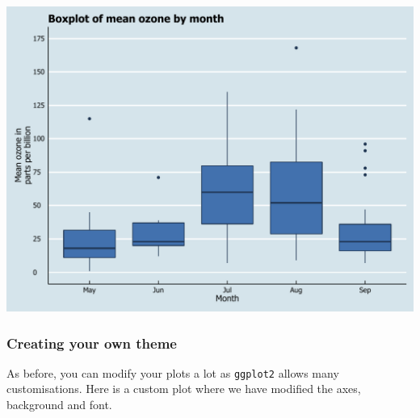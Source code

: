 \documentclass[]{article}
\begin{document}
\begin{center}\includegraphics{0_all_posts_pdf/box_12-1} \end{center}

\subsubsection{Creating your own theme}\label{creating-your-own-theme-9}

As before, you can modify your plots a lot as \texttt{ggplot2} allows
many customisations. Here is a custom plot where we have modified the
axes, background and font.
\end{document}
